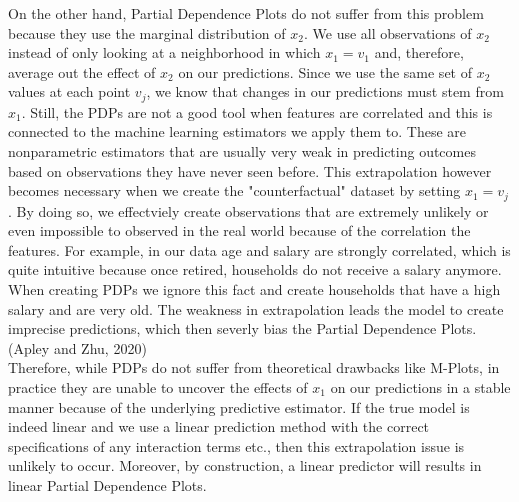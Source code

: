 On the other hand, Partial Dependence Plots do not suffer from this problem because they use the marginal distribution of $x_2$. We use all observations of $x_2$ instead of only looking at a neighborhood in which $x_1=v_1$ and, therefore, average out the effect of $x_2$ on our predictions. Since we use the same set of $x_2$ values at each point $v_j$, we know that changes in our predictions must stem from $x_1.$ Still, the PDPs are not a good tool when features are correlated and this is connected to the machine learning estimators we apply them to. These are nonparametric estimators that are usually very weak in predicting outcomes based on observations they have never seen before. This extrapolation however becomes necessary when we create the "counterfactual" dataset by setting $x_1=v_j$. By doing so, we effectviely create observations that are extremely unlikely or even impossible to observed in the real world because of the correlation the features. For example, in our data age and salary are strongly correlated, which is quite intuitive because once retired, households do not receive a salary anymore. When creating PDPs we ignore this fact and create households that have a high salary and are very old. The weakness in extrapolation leads the model to create imprecise predictions, which then severly bias the Partial Dependence Plots. (Apley and Zhu, 2020)  \\
Therefore, while PDPs do not suffer from theoretical drawbacks like M-Plots, in practice they are unable to uncover the effects of $x_1$ on our predictions in a stable manner because of the underlying predictive estimator. If the true model is indeed linear and we use a linear prediction method with the correct specifications of any interaction terms etc., then this extrapolation issue is unlikely to occur. Moreover, by construction, a linear predictor will results in linear Partial Dependence Plots. 

